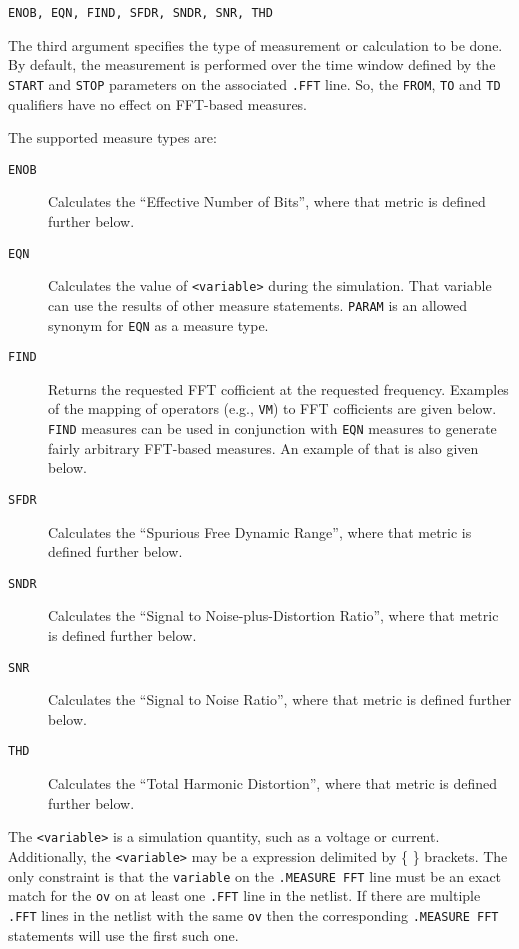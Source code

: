 \begin{Command}
\begin{Arguments}

\texttt{ENOB, EQN, FIND, SFDR, SNDR, SNR, THD}

The third argument specifies the type of measurement or calculation to
be done. By default, the measurement is performed over the time window defined
by the {\tt START} and {\tt STOP} parameters on the associated {\tt .FFT}
line.  So, the  {\tt FROM}, {\tt TO} and {\tt TD} qualifiers have no
effect on FFT-based measures.

The supported measure types are:

\begin{description}
  \item[\tt ENOB] Calculates the ``Effective Number of Bits'', where that metric
    is defined further below.

  \item[\tt EQN] Calculates the value of {\tt <variable>} during the simulation.
    That variable can use the results of other measure statements. {\tt PARAM}
    is an allowed synonym for {\tt EQN} as a measure type.

  \item[\tt FIND] Returns the requested FFT cofficient at the requested
    frequency.  Examples of the mapping of \Xyce{} operators (e.g., {\tt VM})
    to FFT cofficients are given below.  {\tt FIND} measures can be
    used in conjunction with {\tt EQN} measures to generate fairly arbitrary
    FFT-based measures.  An example of that is also given below.

  \item[\tt SFDR] Calculates the ``Spurious Free Dynamic Range'', where that metric
    is defined further below.

  \item[\tt SNDR] Calculates the ``Signal to Noise-plus-Distortion Ratio'', where that metric
    is defined further below.

  \item[\tt SNR] Calculates the ``Signal to Noise Ratio'', where that metric
    is defined further below.

  \item[\tt THD] Calculates the ``Total Harmonic Distortion'', where that metric
    is defined further below.
\end{description}


The \texttt{<variable>} is a simulation quantity, such as a
voltage or current.  Additionally, the \texttt{<variable>} may be
a \Xyce{} expression delimited by \{ \} brackets.  The only constraint
is that the \texttt{variable} on the \texttt{.MEASURE FFT} line must
be an exact match for the \texttt{ov} on at least one \texttt{.FFT} line
in the netlist.  If there are multiple \texttt{.FFT} lines in the netlist
with the same \texttt{ov} then the corresponding \texttt{.MEASURE FFT}
statements will use the first such one.


\end{Arguments}
\end{Command}
